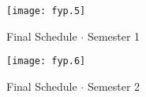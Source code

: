 \begin{figure}[H]
\begin{flushleft}
\texttt{[image: fyp.5]}
\end{flushleft}
\caption{Final Schedule $\cdot$ Semester 1}
\label{fig:fin_gantt1}
\end{figure}

\begin{figure}[H]
\begin{flushleft}
\texttt{[image: fyp.6]}
\end{flushleft}
\caption{Final Schedule $\cdot$ Semester 2}
\label{fig:fin_gantt2}
\end{figure}
